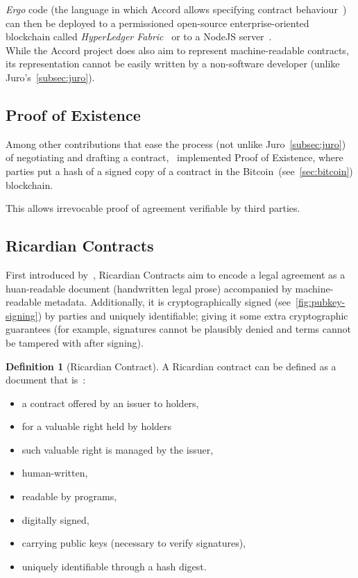 \textit{Ergo} code (the language in which Accord allows specifying contract behaviour~\cite{accordErgo}) can then be
deployed to a permissioned open-source enterprise-oriented blockchain called \textit{HyperLedger
Fabric}~\cite{hyperledgerFabric_repo, accordFabricDeployDocs} or to a NodeJS server~\cite{accordNodeJSDeployDocs}.\\

While the Accord project does also aim to represent machine-readable contracts, its representation
cannot be easily written by a non-software developer (unlike Juro's~\ref{subsec:juro}).

\subsection{Proof of Existence}\label{subsec:proof-of-existence}

Among other contributions that ease the process (not unlike Juro~\ref{subsec:juro}) of negotiating
and drafting a contract,~\cite[Express Agreement]{expressAgreement} implemented Proof of Existence,
where parties put a hash of a signed copy of a contract in the Bitcoin~(see~\ref{sec:bitcoin})
blockchain.

This allows irrevocable proof of agreement verifiable by third parties.

\subsection{Ricardian Contracts}\label{subsec:ricardian-contracts}

First introduced by~\cite{grigg2004ricardian, ricardianWeb}, Ricardian Contracts aim to encode a legal agreement as a huan-readable document (handwritten legal prose) accompanied by machine-readable metadata.
Additionally, it is cryptographically signed (see~\ref{fig:pubkey-signing}) by parties and uniquely identifiable;
giving it some extra cryptographic guarantees (for example, signatures cannot be plausibly denied and terms cannot be tampered with after signing).

\theoremstyle{definition}
\newtheorem{definition}{Definition}

\begin{definition}[Ricardian Contract]
    \label{def:ricardian}
    A Ricardian contract can be defined as a document that is~\cite[]{grigg2004ricardian}:
    \begin{itemize}
        \item a contract offered by an issuer to holders,
        \item for a valuable right held by holders
        \item such valuable right is managed by the issuer,
        \item human-written,
        \item readable by programs,
        \item digitally signed,
        \item carrying public keys (necessary to verify signatures),
        \item uniquely identifiable through a hash digest.
    \end{itemize}
\end{definition}

